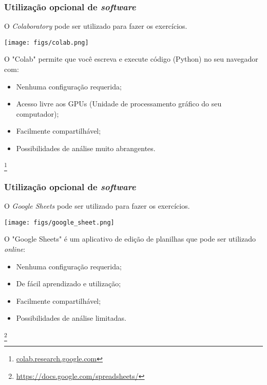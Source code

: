 \documentclass[11pt]{beamer}
\newcommand\blfootnote[1]{%
  \begingroup
  \renewcommand\thefootnote{}\footnote{#1}%
  \addtocounter{footnote}{-1}%
  \endgroup
}
\begin{document}
\begin{frame}
\frametitle{Utilização opcional de \textit{software}}
O \textit{Colaboratory} pode ser utilizado para fazer os exercícios.

\begin{center}\texttt{[image: figs/colab.png]} \end{center}

O "Colab" permite que você escreva e execute código (Python) no seu navegador com:
\begin{itemize}
\item Nenhuma configuração requerida;
\item Acesso livre aos GPUs (Unidade de processamento gráfico do seu computador);
\item Facilmente compartilhável;
\item Possibilidades de análise muito abrangentes.
\end{itemize} 

\blfootnote{\url{colab.research.google.com}}
\end{frame}

\begin{frame}
\frametitle{Utilização opcional de \textit{software}}
O \textit{Google Sheets} pode ser utilizado para fazer os exercícios.

\begin{center}\texttt{[image: figs/google\_sheet.png]} \end{center}

O "Google Sheets" é um aplicativo de edição de planilhas que pode ser utilizado \textit{online}:
\begin{itemize}
\item Nenhuma configuração requerida;
\item De fácil aprendizado e utilização;
\item Facilmente compartilhável;
\item Possibilidades de análise limitadas.
\end{itemize} 

\blfootnote{\url{https://docs.google.com/spreadsheets/}}
\end{frame}
\end{document}
